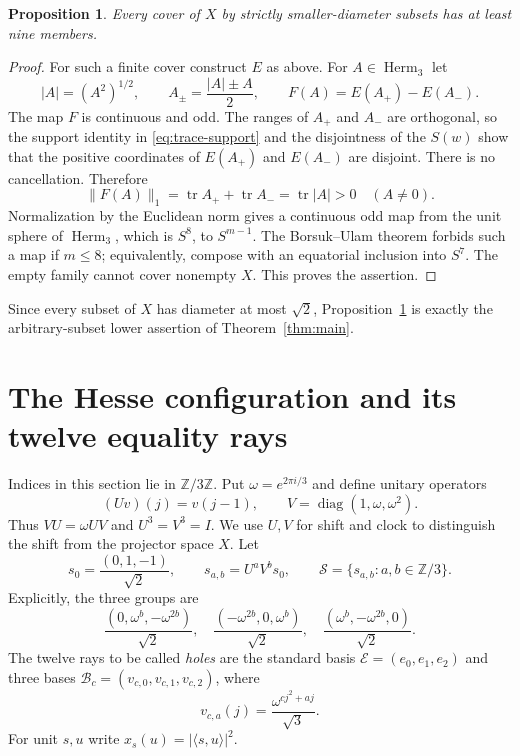 \documentclass[11pt,a4paper]{article}
\newtheorem{proposition}[theorem]{Proposition}
\theoremstyle{remark}
\numberwithin{equation}{section}
\newcommand{\Herm}{\operatorname{Herm}}
\newcommand{\tr}{\operatorname{tr}}
\newcommand{\ip}[2]{\langle #1,#2\rangle}
\newcommand{\norm}[1]{\lVert #1\rVert}
\newcommand{\abs}[1]{\lvert #1\rvert}
\begin{document}
\begin{proposition}\label{prop:lower}
Every cover of $X$ by strictly smaller-diameter subsets has at least nine members.
\end{proposition}
\begin{proof}
For such a finite cover construct $E$ as above. For $A\in\Herm_3$ let
\[
 |A|=(A^2)^{1/2},\qquad A_\pm=\frac{|A|\pm A}{2},\qquad
 F(A)=E(A_+)-E(A_-).
\]
The map $F$ is continuous and odd. The ranges of $A_+$ and $A_-$ are orthogonal, so the support identity in \eqref{eq:trace-support} and the disjointness of the $S(w)$ show that the positive coordinates of $E(A_+)$ and $E(A_-)$ are disjoint. There is no cancellation. Therefore
\[
 \norm{F(A)}_1=\tr A_++\tr A_-=\tr|A|>0\quad(A\ne0).
\]
Normalization by the Euclidean norm gives a continuous odd map from the unit sphere of $\Herm_3$, which is $S^8$, to $S^{m-1}$. The Borsuk--Ulam theorem forbids such a map if $m\le8$; equivalently, compose with an equatorial inclusion into $S^7$. The empty family cannot cover nonempty $X$. This proves the assertion.
\end{proof}
Since every subset of $X$ has diameter at most $\sqrt2$, Proposition~\ref{prop:lower} is exactly the arbitrary-subset lower assertion of Theorem~\ref{thm:main}.

\section{The Hesse configuration and its twelve equality rays}
Indices in this section lie in $\mathbb Z/3\mathbb Z$. Put $\omega=e^{2\pi i/3}$ and define unitary operators
\[
 (Uv)(j)=v(j-1),\qquad V=\operatorname{diag}(1,\omega,\omega^2).
\]
Thus $VU=\omega UV$ and $U^3=V^3=I$. We use $U,V$ for shift and clock to distinguish the shift from the projector space $X$. Let
\begin{equation}\label{eq:sic}
 s_0=\frac{(0,1,-1)}{\sqrt2},\qquad s_{a,b}=U^aV^bs_0,
 \qquad \mathcal S=\{s_{a,b}:a,b\in\mathbb Z/3\}.
\end{equation}
Explicitly, the three groups are
\[
 \frac{(0,\omega^b,-\omega^{2b})}{\sqrt2},\quad
 \frac{(-\omega^{2b},0,\omega^b)}{\sqrt2},\quad
 \frac{(\omega^b,-\omega^{2b},0)}{\sqrt2}.
\]
The twelve rays to be called \emph{holes} are the standard basis $\mathcal E=(e_0,e_1,e_2)$ and three bases $\mathcal B_c=(v_{c,0},v_{c,1},v_{c,2})$, where
\begin{equation}\label{eq:mub}
 v_{c,a}(j)=\frac{\omega^{cj^2+aj}}{\sqrt3}.
\end{equation}
For unit $s,u$ write $x_s(u)=\abs{\ip su}^2$.
\end{document}
